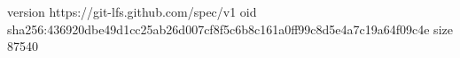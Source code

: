 version https://git-lfs.github.com/spec/v1
oid sha256:436920dbe49d1cc25ab26d007cf8f5c6b8c161a0ff99c8d5e4a7c19a64f09c4e
size 87540
